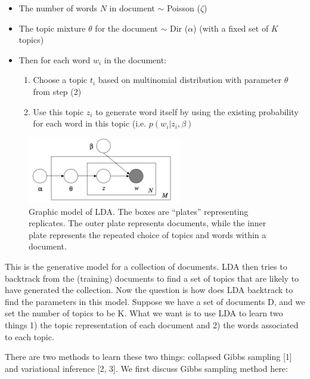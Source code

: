 \documentclass{article} %
\begin{document}
\begin{itemize}
\item The number of words $N$ in document $\sim$ Poisson ($\zeta$)
\item The topic mixture $\theta$ for the document $\sim$ Dir ($\alpha$) (with a fixed set of $K$ topics)
\item Then for each word $w_i$ in the document:
\begin{enumerate}
\item Choose a topic $t_i$ based on multinomial distribution with parameter $\theta$ from step (2)
\item Use this topic $z_i$ to generate word itself by using the existing probability for each word in this topic (i.e. $p(w_i | z_i, \beta)$
\end{enumerate}
\end{itemize}

\begin{figure}
    \centering
    \includegraphics[width=0.6\textwidth]{graphmodel}
    \caption{Graphic model of LDA. The boxes are ``plates'' representing replicates. The outer plate represents documents, while the inner plate represents the repeated choice of topics and words within a document.}
    \label{fig:graphmodel}
\end{figure}


This is the generative model for a collection of documents. LDA then tries to backtrack from the (training) documents to find a set of topics that are likely to have generated the collection. Now the question is how does LDA backtrack to find the parameters in this model. Suppose we have a set of documents D, and we set the number of topics to be K. What we want is to use LDA to learn two things 1) the topic representation of each document and 2) the words associated to each topic.

There are two methods to learn these two things: collapsed Gibbs sampling [1] and variational inference [2, 3]. We first discuss Gibbs sampling method here:
\end{document}

